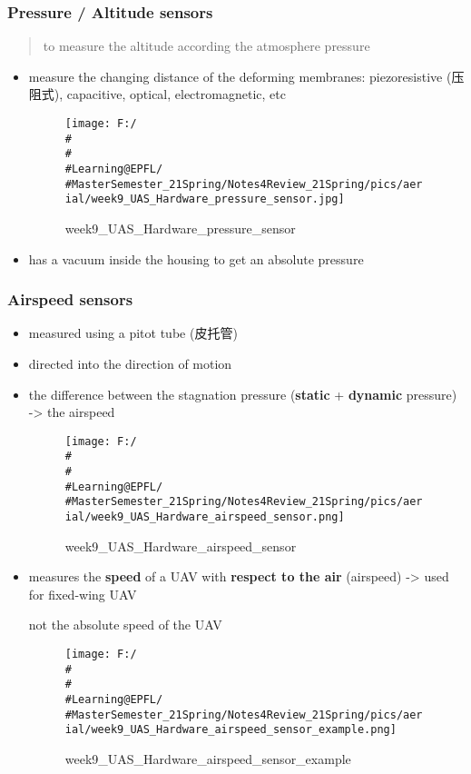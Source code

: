 \documentclass[]{article}
\begin{document}
\subsubsection{Pressure / Altitude sensors}\label{header-n2253}

\begin{quote}
to measure the altitude according the atmosphere pressure
\end{quote}

\begin{itemize}
\item
  measure the changing distance of the deforming membranes:
  piezoresistive (压阻式), capacitive, optical, electromagnetic, etc

  \begin{figure}
  \centering
  \texttt{[image: F:/\\\#\\\#\\\#Learning@EPFL/\\\#MasterSemester\_21Spring/Notes4Review\_21Spring/pics/aerial/week9\_UAS\_Hardware\_pressure\_sensor.jpg]}
  \caption{week9\_UAS\_Hardware\_pressure\_sensor}
  \end{figure}
\item
  has a vacuum inside the housing to get an absolute pressure 
\end{itemize}

\subsubsection{Airspeed sensors}\label{header-n2262}

\begin{itemize}
\item
  measured using a pitot tube (皮托管)
\item
  directed into the direction of motion
\item
  the difference between the stagnation pressure (\textbf{static} +
  \textbf{dynamic} pressure) -\textgreater{} the airspeed

  \begin{figure}
  \centering
  \texttt{[image: F:/\\\#\\\#\\\#Learning@EPFL/\\\#MasterSemester\_21Spring/Notes4Review\_21Spring/pics/aerial/week9\_UAS\_Hardware\_airspeed\_sensor.png]}
  \caption{week9\_UAS\_Hardware\_airspeed\_sensor}
  \end{figure}
\item
  measures the \textbf{speed} of a UAV with \textbf{respect to the air}
  (airspeed) -\textgreater{} used for fixed-wing UAV

  not the absolute speed of the UAV

  \begin{figure}
  \centering
  \texttt{[image: F:/\\\#\\\#\\\#Learning@EPFL/\\\#MasterSemester\_21Spring/Notes4Review\_21Spring/pics/aerial/week9\_UAS\_Hardware\_airspeed\_sensor\_example.png]}
  \caption{week9\_UAS\_Hardware\_airspeed\_sensor\_example}
  \end{figure}
\end{itemize}
\end{document}

